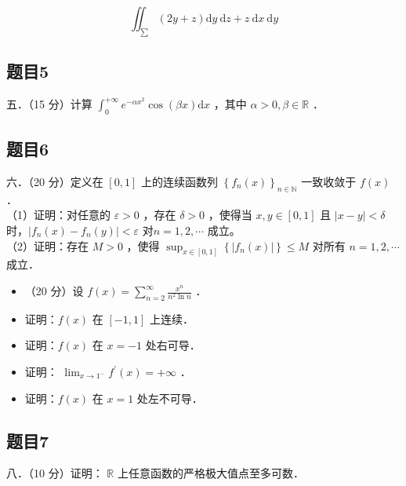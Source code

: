 \documentclass{article}
\begin{document}
\[
\iint_{\sum}(2 y+z) \mathrm{d} y \mathrm{~d} z+z \mathrm{~d} x \mathrm{~d} y
\]

\subsection{题目5}
五．（15 分）计算 \(\int_{0}^{+\infty} e^{-\alpha x^{2}} \cos (\beta x) \mathrm{d} x\) ，其中 \(\alpha>0, \beta \in \mathbb{R}\) ．

\subsection{题目6}
六．（20 分）定义在 \([0,1]\) 上的连续函数列 \(\left\{f_{n}(x)\right\}_{n \in \mathbb{N}}\) 一致收敛于 \(f(x)\) ．\\
（1）证明：对任意的 \(\varepsilon>0\) ，存在 \(\delta>0\) ，使得当 \(x, y \in[0,1]\) 且 \(|x-y|<\delta\) 时，\(\left|f_{n}(x)-f_{n}(y)\right|<\varepsilon\) 对\(n=1,2, \cdots\) 成立。\\
（2）证明：存在 \(M>0\) ，使得 \(\sup _{x \in[0,1]}\left\{\left|f_{n}(x)\right|\right\} \leq M\) 对所有 \(n=1,2, \cdots\) 成立．

\begin{itemize}
  \item[七．] （20 分）设 \(f(x)=\sum_{n=2}^{\infty} \frac{x^{n}}{n^{2} \ln n}\) ．
  \item[（1）] 证明：\(f(x)\) 在 \([-1,1]\) 上连续．
  \item[（2）] 证明：\(f(x)\) 在 \(x=-1\) 处右可导．
  \item[（3）] 证明： \(\lim _{x \rightarrow 1^{-}} f^{\prime}(x)=+\infty\) ．
  \item[（4）] 证明：\(f(x)\) 在 \(x=1\) 处左不可导．
\end{itemize}

\subsection{题目7}
八．（10 分）证明： \(\mathbb{R}\) 上任意函数的严格极大值点至多可数．
\end{document}
